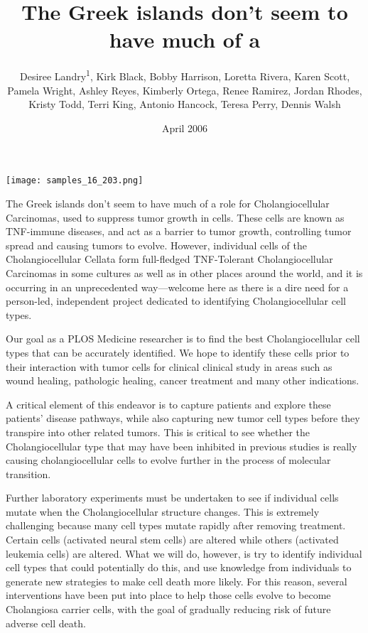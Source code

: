 \documentclass{article}
\title{The Greek islands don’t seem to have much of a}
\author{Desiree Landry\textsuperscript{1},  Kirk Black,  Bobby Harrison,  Loretta Rivera,  Karen Scott,  Pamela Wright,  Ashley Reyes,  Kimberly Ortega,  Renee Ramirez,  Jordan Rhodes,  Kristy Todd,  Terri King,  Antonio Hancock,  Teresa Perry,  Dennis Walsh}
\affil{\textsuperscript{1}Johns Hopkins University}
\date{April 2006}
\begin{document}
\maketitle

\begin{center}
\begin{minipage}{0.75\linewidth}
\texttt{[image: samples\_16\_203.png]}
\end{minipage}
\end{center}

The Greek islands don’t seem to have much of a role for Cholangiocellular Carcinomas, used to suppress tumor growth in cells. These cells are known as TNF-immune diseases, and act as a barrier to tumor growth, controlling tumor spread and causing tumors to evolve. However, individual cells of the Cholangiocellular Cellata form full-fledged TNF-Tolerant Cholangiocellular Carcinomas in some cultures as well as in other places around the world, and it is occurring in an unprecedented way—welcome here as there is a dire need for a person-led, independent project dedicated to identifying Cholangiocellular cell types.

Our goal as a PLOS Medicine researcher is to find the best Cholangiocellular cell types that can be accurately identified. We hope to identify these cells prior to their interaction with tumor cells for clinical clinical study in areas such as wound healing, pathologic healing, cancer treatment and many other indications.

A critical element of this endeavor is to capture patients and explore these patients' disease pathways, while also capturing new tumor cell types before they transpire into other related tumors. This is critical to see whether the Cholangiocellular type that may have been inhibited in previous studies is really causing cholangiocellular cells to evolve further in the process of molecular transition.

Further laboratory experiments must be undertaken to see if individual cells mutate when the Cholangiocellular structure changes. This is extremely challenging because many cell types mutate rapidly after removing treatment. Certain cells (activated neural stem cells) are altered while others (activated leukemia cells) are altered. What we will do, however, is try to identify individual cell types that could potentially do this, and use knowledge from individuals to generate new strategies to make cell death more likely. For this reason, several interventions have been put into place to help those cells evolve to become Cholangiosa carrier cells, with the goal of gradually reducing risk of future adverse cell death.
\end{document}
